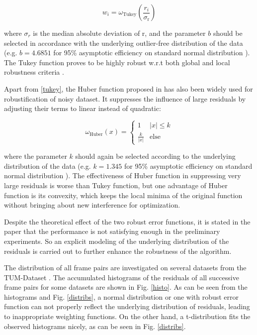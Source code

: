 \documentclass[acmsmall, nonacm, 11pt]{acmart}
\begin{document}
\begin{equation}
w_{i}=\omega_{\text {Tukey}}\left(\frac{r_{i}}{\sigma_{\mathrm{r}}}\right)
\end{equation}

\noindent where $\sigma_r$ is the median absolute deviation of $\mathrm{r}$, and the parameter $b$ should be selected in accordance with the underlying outlier-free distribution of the data (e.g. $b=4.6851$ for 95\% asymptotic efficiency on standard normal distribution \cite{zhang1997parameter}). The Tukey function proves to be highly robust w.r.t both global and local robustness criteria \cite{chen2002influence}.

Apart from \eqref{tukey}, the Huber function proposed in \cite{huber2004robust} has also been widely used for robustification of noisy dataset. It suppresses the influence of large residuals by adjusting their terms to linear instead of quadratic:

\begin{equation}
\omega_{\text{Huber}}(x)=\left\{
\begin{array}{ll}
{1} & {|x| \leq k} \\
{\frac{k}{|x|}} & {\text{else}}
\end{array}
\right.
\label{huber}
\end{equation}

\noindent where the parameter $k$ should again be selected according to the underlying distribution of the data (e.g. $k = 1.345$ for 95\% asymptotic efficiency on standard normal distribution \cite{zhang1997parameter}). The effectiveness of Huber function in suppressing very large residuals is worse than Tukey function, but one advantage of Huber function is its convexity, which keeps the local minima of the original function without bringing about new interference for optimization.

Despite the theoretical effect of the two robust error functions, it is stated in the paper that the performance is not satisfying enough in the preliminary experiments. So an explicit modeling of the underlying distribution of the residuals is carried out to further enhance the robustness of the algorithm.

The distribution of all frame pairs are investigated on several datasets from the TUM-Dataset \cite{sturm12iros}. The accumulated histograms of the residuals of all successive frame pairs for some datasets are shown in Fig. \ref{histo}. As can be seen from the histograms and Fig. \ref{distribs}, a normal distribution or one with robust error function can not properly reflect the underlying distribution of residuals, leading to inappropriate weighting functions. On the other hand, a t-distribution \cite{lange1989robust} fits the observed histograms nicely, as can be seen in Fig. \ref{distribs}.
\end{document}

